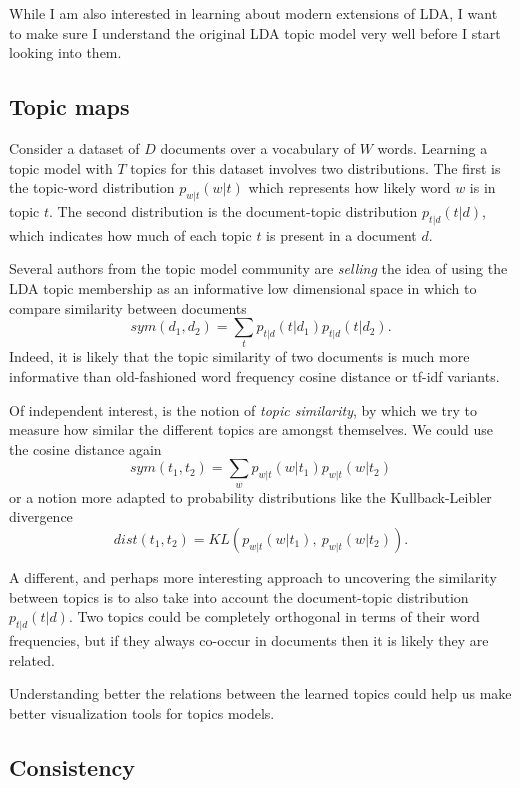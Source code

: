 \documentclass[letterpaper,11pt]{article}
\begin{document}
		While I am also interested in learning about modern extensions of LDA, 
		I want to make sure I understand the original LDA topic model very well before I start looking into them.
		
		
	\subsection{Topic maps}
	
		Consider a dataset of $D$ documents over a vocabulary of $W$ words.
		Learning a topic model with $T$ topics for this dataset involves two distributions.
		The first is the topic-word distribution $p_{w|t}(w|t)$ which represents how likely 
		word $w$ is in topic $t$.
		The second distribution is the document-topic distribution $p_{t|d}(t|d)$, 
		which indicates how much of each topic $t$ is present in a document $d$.
		
		Several authors from the topic model community are \emph{selling} the idea
		of using the LDA topic membership as an informative low dimensional
		space in which to compare similarity between documents
		$$
			sym(d_1,d_2) = \sum_t  p_{t|d}(t|d_1)p_{t|d}(t|d_2).
		$$
		Indeed, it is likely that the topic similarity of two documents is much more informative
		than old-fashioned word frequency cosine distance or tf-idf variants.
		
		Of independent interest, is the notion of \emph{topic similarity}, by which 
		we try to measure how similar the different topics are amongst themselves.
		We could use the cosine distance again
		$$
			sym(t_1,t_2) = \sum_w  p_{w|t}(w|t_1)p_{w|t}(w|t_2)
		$$
		or a notion more adapted to probability distributions like the Kullback-Leibler divergence
		$$
			dist(t_1,t_2) = {KL}(p_{w|t}(w|t_1),\  p_{w|t}(w|t_2)).
		$$

		A different, and perhaps more interesting approach to uncovering the
		similarity between topics is to also take into account the document-topic 
		distribution $p_{t|d}(t|d)$.
		Two topics could be completely orthogonal in terms of their word frequencies,
		but if they always co-occur in documents then it is likely they are related.

		Understanding better the relations between the learned topics could
		help us make better visualization tools for topics models.

		
	\subsection{Consistency}
		
\end{document}
